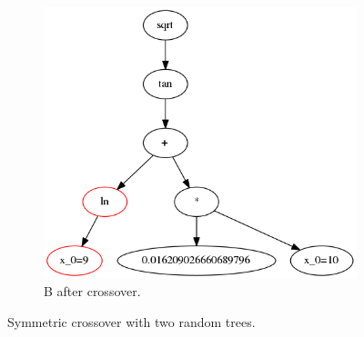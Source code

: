 \begin{figure}
\begin{subfigure}{0.5\textwidth}
        \includegraphics[width=0.8\linewidth]{figures/rightafter.png}
        \caption{B after crossover.}
    \end{subfigure}
    \caption{Symmetric crossover with two random trees.}
    \label{fig:crossover}
\end{figure}

